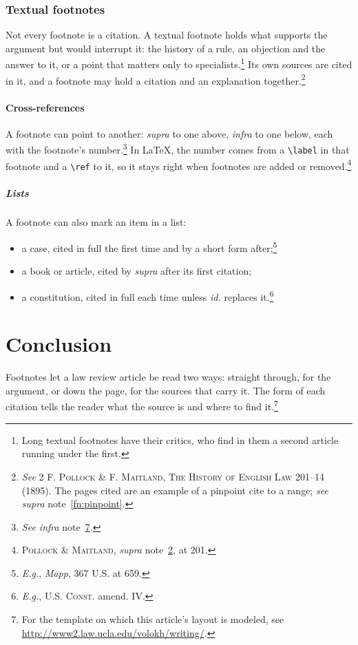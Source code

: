 \documentclass[letterpaper,12pt,twoside]{article}
\begin{document}
\subsubsection{Textual footnotes}

Not every footnote is a citation. A textual footnote holds what supports the argument but would interrupt it: the history of a rule, an objection and the answer to it, or a point that matters only to specialists.\footnote{Long textual footnotes have their critics, who find in them a second article running under the first.} Its own sources are cited in it, and a footnote may hold a citation and an explanation together.\footnote{\emph{See} 2 \textsc{F. Pollock \& F. Maitland, The History of English Law} 201--14 (1895). The pages cited are an example of a pinpoint cite to a range; \emph{see supra} note~\ref{fn:pinpoint}.\label{fn:pollock}}

\paragraph{Cross-references}

\noindent A footnote can point to another: \emph{supra} to one above, \emph{infra} to one below, each with the footnote's number.\footnote{\emph{See infra} note~\ref{fn:conclusion}.} In \LaTeX, the number comes from a \verb|\label| in that footnote and a \verb|\ref| to it, so it stays right when footnotes are added or removed.\footnote{\textsc{Pollock \& Maitland}, \emph{supra} note~\ref{fn:pollock}, at 201.}

\subparagraph{Lists}

\noindent A footnote can also mark an item in a list:
	\begin{itemize}
		\item a case, cited in full the first time and by a short form after;\footnote{\emph{E.g.}, \emph{Mapp}, 367 U.S. at 659.}
		\item a book or article, cited by \emph{supra} after its first citation;
		\item a constitution, cited in full each time unless \emph{id.} replaces it.\footnote{\emph{E.g.}, U.S. \textsc{Const.} amend. IV.}
	\end{itemize}

\section*{Conclusion}

Footnotes let a law review article be read two ways: straight through, for the argument, or down the page, for the sources that carry it. The form of each citation tells the reader what the source is and where to find it.\footnote{For the template on which this article's layout is modeled, see \url{http://www2.law.ucla.edu/volokh/writing/}.\label{fn:conclusion}}
\end{document}
